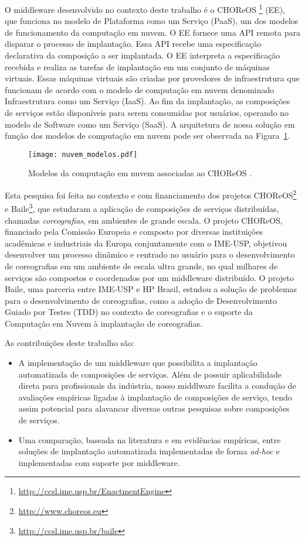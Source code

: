 O middleware desenvolvido no contexto deste trabalho é o CHOReOS \ee 
\footnote{\url{http://ccsl.ime.usp.br/EnactmentEngine}} (EE),
que funciona no modelo de Plataforma como um Serviço (PaaS), 
um dos modelos de funcionamento da computação em nuvem.
O EE fornece uma API remota para disparar o processo de implantação.
Essa API recebe uma especificação declarativa da composição a ser implantada.
O EE interpreta a especificação recebida e realiza as tarefas de implantação
em um conjunto de máquinas virtuais.
Essas máquinas virtuais são criadas por provedores de infraestrutura que funcionam
de acordo com o modelo de computação em nuvem denominado Infraestrutura como um Serviço (IaaS).
Ao fim da implantação, as composições de serviços estão disponíveis para serem consumidas
por usuários, operando no modelo de Software como um Serviço (SaaS).
A arquitetura de nossa solução em função dos modelos de computação em nuvem pode ser observada na Figura~\ref{fig:modelos_nuvem}. 

\begin{figure}[!h]
  \centering
  \texttt{[image: nuvem\_modelos.pdf]} 
  \caption{Modelos da computação em nuvem associadas ao CHOReOS \ee.}
  \label{fig:modelos_nuvem} 
\end{figure}

Esta pesquisa foi feita no contexto e com financiamento dos projetos CHOReOS\footnote{\url{http://www.choreos.eu}} e Baile\footnote{\url{http://ccsl.ime.usp.br/baile}}, que estudaram a aplicação de composições de serviços distribuídas, chamadas \emph{coreografias}, em ambientes de grande escala. O projeto CHOReOS, financiado pela Comissão Europeia e composto por diversas instituições acadêmicas e industriais da Europa conjuntamente com o IME-USP, objetivou desenvolver um processo dinâmico e centrado no usuário para o desenvolvimento de coreografias em um ambiente de escala ultra grande, no qual milhares de serviços são compostos e coordenados por um middleware distribuído. O projeto Baile, uma parceria entre IME-USP e HP Brasil, estudou a solução de problemas para o desenvolvimento de coreografias, como a adoção de Desenvolvimento Guiado por Testes (TDD) no contexto de coreografias e o suporte da Computação em Nuvem à implantação de coreografias.

As contribuições deste trabalho são: 

\begin{itemize}
\item A implementação de um middleware que possibilita a implantação automatizada de composições de serviços. Além de possuir aplicabilidade direta para profissionais da indústria, nosso middlware facilita a condução de avaliações empíricas ligadas à implantação de composições de serviço, tendo assim potencial para alavancar diversas outras pesquisas sobre composições de serviços. 
\item Uma comparação, baseada na literatura e em evidências empíricas, entre soluções de implantação automatizada implementadas de forma \emph{ad-hoc} e implementadas com suporte por middleware.
\end{itemize}

